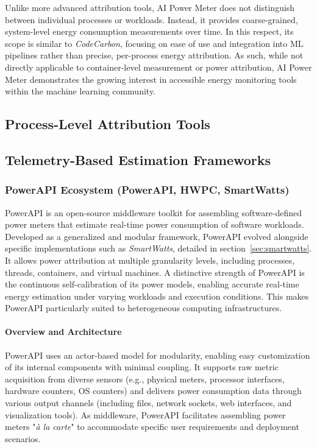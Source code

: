 Unlike more advanced attribution tools, AI Power Meter does not distinguish between individual processes or workloads. Instead, it provides coarse-grained, system-level energy consumption measurements over time. In this respect, its scope is similar to \textit{CodeCarbon}, focusing on ease of use and integration into ML pipelines rather than precise, per-process energy attribution. As such, while not directly applicable to container-level measurement or power attribution, AI Power Meter demonstrates the growing interest in accessible energy monitoring tools within the machine learning community.

\subsection{Process-Level Attribution Tools}
\label{sec:process-tools}
\subsection{Telemetry-Based Estimation Frameworks}
\label{sec:telemetry-tools}

\subsubsection{PowerAPI Ecosystem\parencite{powerapi2024github} (PowerAPI, HWPC, SmartWatts)}
\label{sec:powerApiFramework}

PowerAPI\parencite{fieni2024powerapi} is an open-source middleware toolkit for assembling software-defined power meters that estimate real-time power consumption of software workloads. Developed as a generalized and modular framework, PowerAPI evolved alongside specific implementations such as \textit{SmartWatts}, detailed in section~\ref{sec:smartwatts}. It allows power attribution at multiple granularity levels, including processes, threads, containers, and virtual machines. A distinctive strength of PowerAPI is the continuous self-calibration of its power models, enabling accurate real-time energy estimation under varying workloads and execution conditions. This makes PowerAPI particularly suited to heterogeneous computing infrastructures.

\paragraph{Overview and Architecture}

PowerAPI uses an actor-based model for modularity, enabling easy customization of its internal components with minimal coupling. It supports raw metric acquisition from diverse sensors (e.g., physical meters, processor interfaces, hardware counters, OS counters) and delivers power consumption data through various output channels (including files, network sockets, web interfaces, and visualization tools). As middleware, PowerAPI facilitates assembling power meters "\textit{à la carte}" to accommodate specific user requirements and deployment scenarios.

